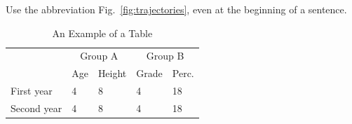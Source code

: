 \documentclass[letterpaper, 10 pt, conference]{ieeeconf}
\begin{document}
Use the abbreviation Fig.~\ref{fig:trajectories}, even at the beginning of a sentence.

\begin{table}[t]
\caption{An Example of a Table}
\label{table:example}
\centering
\begin{tabular}{lllll}
  \toprule
  &\multicolumn{2}{c}{Group A}
  &\multicolumn{2}{c}{Group B} \\
  \cmidrule(lr){2-3} \cmidrule(l){4-5} 
  &Age 
  &Height 
  &Grade 
  &Perc.\\
  \midrule
  First year & 4 & 8 & 4 & 18 \\
  Second year & 4 & 8 & 4 & 18 \\
  \bottomrule
\end{tabular}
\end{table}
\end{document}
